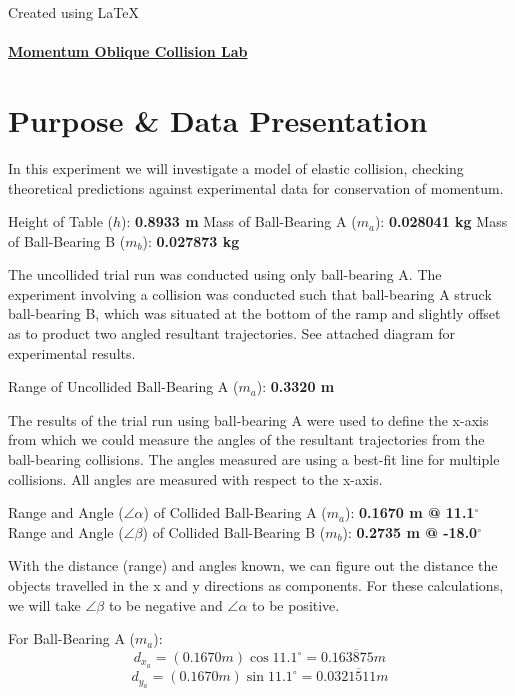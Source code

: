 \documentclass[12pt]{article}
\begin{document}
\begin{center}
	\footnotesize{Created using \LaTeX\ }
	\paragraph{}
	\LARGE{\textbf{\underline{Momentum Oblique Collision Lab}}}
\end{center}

\section{Purpose \& Data Presentation}

In this experiment we will investigate a model of elastic collision, checking theoretical predictions against experimental data for conservation of momentum.
	
Height of Table ($h$): \textbf{0.8933 m}\newline
Mass of Ball-Bearing A ($m_{a}$): \textbf{0.028041 kg}\newline
Mass of Ball-Bearing B ($m_{b}$): \textbf{0.027873 kg}

The uncollided trial run was conducted using only ball-bearing A. The experiment involving a collision was conducted such that ball-bearing A struck ball-bearing B, which was situated at the bottom of the ramp and slightly offset as to product two angled resultant trajectories. See attached diagram for experimental results.

Range of Uncollided Ball-Bearing A ($m_{a}$): \textbf{0.3320 m}

The results of the trial run using ball-bearing A were used to define the x-axis from which we could measure the angles of the resultant trajectories from the ball-bearing collisions. The angles measured are using a best-fit line for multiple collisions. All angles are measured with respect to the x-axis.

Range and Angle ($\angle \alpha$) of Collided Ball-Bearing A ($m_{a}$): \textbf{0.1670 m @ 11.1$^{\circ}$}\newline
Range and Angle ($\angle \beta$) of Collided Ball-Bearing B ($m_{b}$): \textbf{0.2735 m @ -18.0$^{\circ}$}

With the distance (range) and angles known, we can figure out the distance the objects travelled in the x and y directions as components. For these calculations, we will take $\angle \beta$ to be negative and $\angle \alpha$ to be positive.

For Ball-Bearing A ($m_{a}$):
\begin{equation}
d_{x_{a}}=(0.1670m)\cos11.1^{\circ}=0.163\overline{8}75m
\end{equation}
\begin{equation}
d_{y_{a}}=(0.1670m)\sin11.1^{\circ}=0.0321\overline{5}11m
\end{equation}
\end{document}
